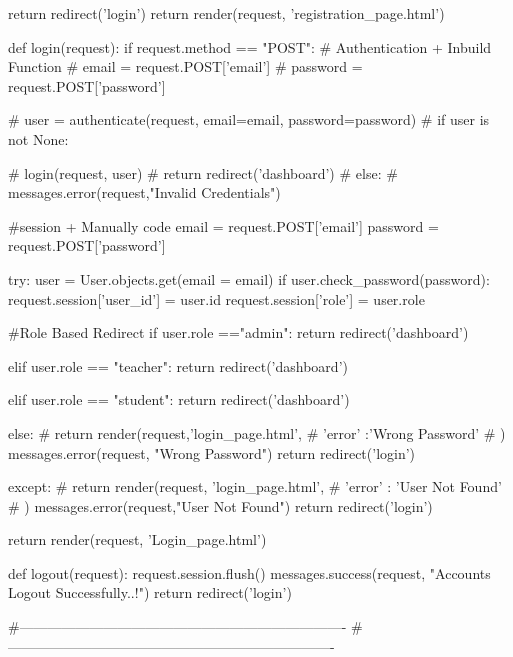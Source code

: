         return redirect('login')
    return render(request, 'registration_page.html')



def login(request):
    if request.method == "POST":
         # Authentication + Inbuild Function
        # email = request.POST['email']
        # password = request.POST['password']

        # user = authenticate(request, email=email, password=password)
        # if user is not None:
            
        #     login(request, user)
        #     return redirect('dashboard')
        # else:
        #     messages.error(request,"Invalid Credentials")
        
       

        #session + Manually code
        email = request.POST['email']
        password = request.POST['password']

        try:
            user = User.objects.get(email = email)
            if user.check_password(password):
                request.session['user_id'] = user.id
                request.session['role'] = user.role
                
                #Role Based Redirect
                if user.role =="admin":
                    return redirect('dashboard')
                
                elif user.role == "teacher":
                    return redirect('dashboard')
                
                elif user.role == "student":
                    return redirect('dashboard')
                
            else:
                # return render(request,'login_page.html',{
                #     'error' :'Wrong Password'
                # })
                messages.error(request, "Wrong Password")
                return redirect('login')
                
        except:
            # return render(request, 'login_page.html', {
            #     'error' :  'User Not Found'
            # })
            messages.error(request,"User Not Found")
            return redirect('login')
        
    
    return render(request, 'Login_page.html')

def logout(request):
    request.session.flush()
    messages.success(request, "Accounts Logout Successfully..!")
    return redirect('login')

#----------------------------------------------------------------------
#----------------------------------------------------------------------
 

